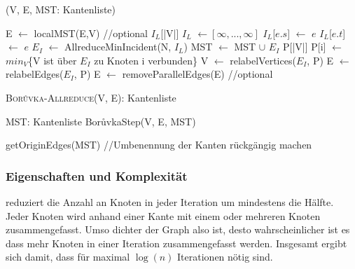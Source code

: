 \begin{algorithm} 
\caption{\boruvkaStep(V, E, MST: Kantenliste)}
\begin{algorithmic}[1]
\label{BoruvkaStep}

\STATE E $\leftarrow$ localMST(E,V) //optional
\STATE $I_L$[|V|]
\STATE $I_L$ $\gets [\infty, ..., \infty]$ 
 \label{Incident-start}
        \STATE $I_L$[$e.s$] $\gets$ $e$
    \ENDIF
        \STATE $I_L$[$e.t$] $\gets$ $e$
    \ENDIF
\ENDFOR \label{Incident-end}
\STATE $E_I$ $\leftarrow$ AllreduceMinIncident(N, $I_L$) \label{Allreduce-code}
 \label{addMST-start}
    \STATE MST $\gets$ MST $\cup$ $E_I$ 
\ENDIF \label{addMST-end}
\STATE P[|V|]
 \label{parent-start}
    \STATE P[i] $\gets$ $min_V$\{V ist über $E_I$ zu Knoten i verbunden\}
\ENDFOR \label{parent-end}
\STATE V $\gets$ relabelVertices($E_I$, P) \label{kontrahiere-start}
\STATE E $\gets$ relabelEdges($E_I$, P)\label{kontrahiere-end}
\STATE E $\gets$ removeParallelEdges(E) //optional \label{removeParallel-code}
\end{algorithmic}
\end{algorithm}



\begin{algorithm} 
\caption{\textsc{Bor{\r u}vka-Allreduce}(V, E): Kantenliste}
\begin{algorithmic}[1]
\label{Boruvka-Allreduce-Algo}

\STATE MST: Kantenliste
    \STATE Bor{\r u}vkaStep(V, E, MST)
\ENDWHILE

\RETURN getOriginEdges(MST) //Umbenennung der Kanten rückgängig machen
\end{algorithmic}
\end{algorithm}


\subsubsection{Eigenschaften und Komplexität}
\boruvkaAllreduce reduziert die Anzahl an Knoten in jeder Iteration um mindestens die Hälfte. Jeder Knoten wird anhand einer Kante mit einem oder mehreren Knoten zusammengefasst. Umso dichter der Graph also ist, desto wahrscheinlicher ist es dass mehr Knoten in einer Iteration zusammengefasst werden. Insgesamt ergibt sich damit, dass für \boruvkaAllreduce maximal $\log(n)$ Iterationen nötig sind.

